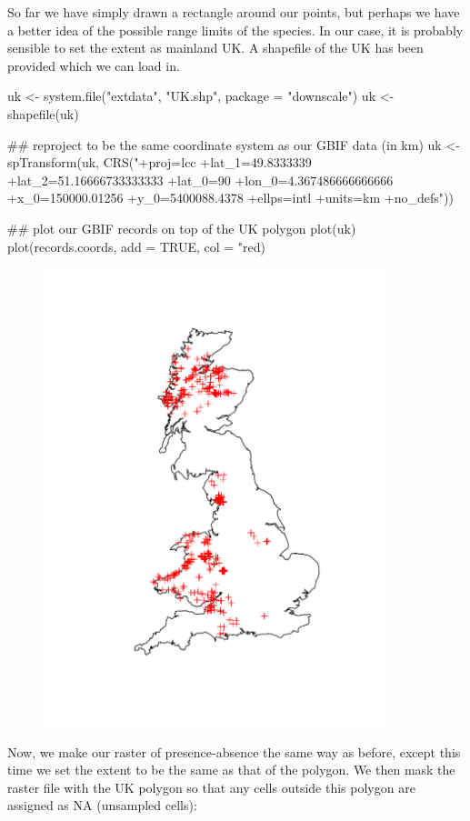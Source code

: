 \documentclass{article}[12pt, a4paper]
\begin{document}
So far we have simply drawn a rectangle around our points, but perhaps we have a better idea of the possible range limits of the species. In our case, it is probably sensible to set the extent as mainland UK. A shapefile of the UK has been provided which we can load in.

\begin{Schunk}
\begin{Sinput}
uk <- system.file("extdata", "UK.shp", package = "downscale")
uk <- shapefile(uk)

## reproject to be the same coordinate system as our GBIF data (in km)
uk <- spTransform(uk,
                  CRS("+proj=lcc +lat_1=49.8333339 +lat_2=51.16666733333333
                       +lat_0=90 +lon_0=4.367486666666666 +x_0=150000.01256 
                       +y_0=5400088.4378 +ellps=intl +units=km +no_defs"))

## plot our GBIF records on top of the UK polygon
plot(uk)
plot(records.coords, add = TRUE, col = "red)
\end{Sinput}
\end{Schunk}

\begin{figure}[!ht]
\centering
\includegraphics[width=10cm]{Downscaling-downscale38}
\end{figure}

\newpage
Now, we make our raster of presence-absence the same way as before, except this time we set the extent to be the same as that of the polygon. We then mask the raster file with the UK polygon so that any cells outside this polygon are assigned as NA (unsampled cells):
\end{document}
